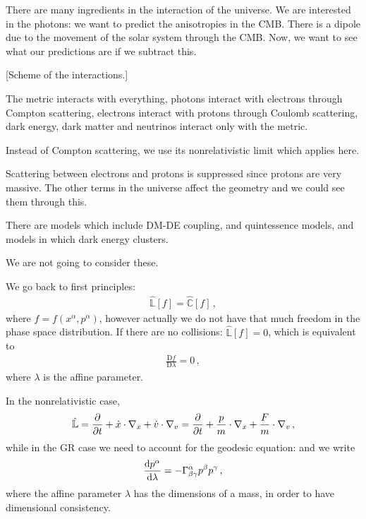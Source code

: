 \documentclass[main.tex]{subfiles}
\begin{document}
There are many ingredients in the interaction of the universe. We are interested in the photons: we want to predict the anisotropies in the CMB. 
There is a dipole due to the movement of the solar system through the CMB. Now, we want to see what our predictions are if we subtract this. 

[Scheme of the interactions.]

The metric interacts with everything, photons interact with electrons through Compton scattering, electrons interact with protons through Coulomb scattering, dark energy, dark matter and neutrinos  interact only with the metric.

Instead of Compton scattering, we use its nonrelativistic limit which applies here. 

Scattering between electrons and protons is suppressed since protons are very massive. The other terms in the universe affect the geometry and we could see them through this. 

There are models which include DM-DE coupling, and quintessence models, 
and models in which dark energy clusters. 

We are not going to consider these. 

We go back to first principles: 
%
\begin{align}
\hat{\mathbb{L}} [f] = \hat{\mathbb{C}} [f]
\,,
\end{align}
%
where \(f = f(x^{\alpha }, p^{\alpha })\), however actually we do not have that much freedom in the phase space distribution. 
If there are no collisions: \(\hat{\mathbb{L}} [f] =0 \), which is equivalent to 
%
\begin{align}
\frac{\mathrm{D}f}{\mathrm{D}\lambda } =0
\,,
\end{align}
%
where \(\lambda \) is the affine parameter. 

In the nonrelativistic case, 
%
\begin{align}
\hat{\mathbb{L}} = \pdv{}{t} + \dot{x} \cdot \nabla_{x} + \dot{v} \cdot \nabla_{v} = \pdv{}{t} + \frac{p}{m} \cdot \nabla_{x} + \frac{F}{m} \cdot \nabla_{v} 
\,,
\end{align}
%
while in the GR case we need to account for the geodesic equation: and we write 
%
\begin{align}
\dv{p^{\alpha }}{\lambda } = - \Gamma^{\alpha }_{\beta \gamma } p^{\beta } p^{\gamma }
\,,
\end{align}
%
where the affine parameter \(\lambda \) has the dimensions of a mass, in order to have dimensional consistency.
\end{document}
